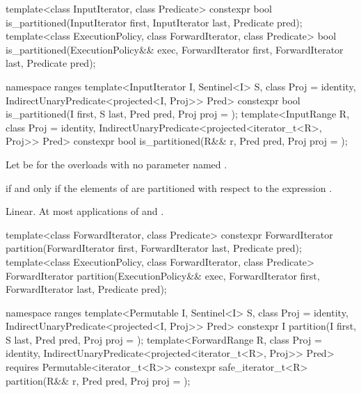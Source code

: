 %
\begin{itemdecl}
template<class InputIterator, class Predicate>
  constexpr bool is_partitioned(InputIterator first, InputIterator last, Predicate pred);
template<class ExecutionPolicy, class ForwardIterator, class Predicate>
  bool is_partitioned(ExecutionPolicy&& exec,
                      ForwardIterator first, ForwardIterator last, Predicate pred);

namespace ranges {
  template<InputIterator I, Sentinel<I> S, class Proj = identity,
           IndirectUnaryPredicate<projected<I, Proj>> Pred>
    constexpr bool is_partitioned(I first, S last, Pred pred, Proj proj = {});
  template<InputRange R, class Proj = identity,
           IndirectUnaryPredicate<projected<iterator_t<R>, Proj>> Pred>
    constexpr bool is_partitioned(R&& r, Pred pred, Proj proj = {});
}
\end{itemdecl}

\begin{itemdescr}
\pnum
Let  be 
for the overloads with no parameter named .

\pnum
\returns
{} if and only if the elements  of 
are partitioned with respect to the expression
.

\pnum
\complexity
Linear.
At most  applications of  and .
\end{itemdescr}

%
\begin{itemdecl}
template<class ForwardIterator, class Predicate>
  constexpr ForwardIterator
    partition(ForwardIterator first, ForwardIterator last, Predicate pred);
template<class ExecutionPolicy, class ForwardIterator, class Predicate>
  ForwardIterator
    partition(ExecutionPolicy&& exec,
              ForwardIterator first, ForwardIterator last, Predicate pred);

namespace ranges {
  template<Permutable I, Sentinel<I> S, class Proj = identity,
           IndirectUnaryPredicate<projected<I, Proj>> Pred>
    constexpr I
      partition(I first, S last, Pred pred, Proj proj = {});
  template<ForwardRange R, class Proj = identity,
           IndirectUnaryPredicate<projected<iterator_t<R>, Proj>> Pred>
    requires Permutable<iterator_t<R>>
    constexpr safe_iterator_t<R>
      partition(R&& r, Pred pred, Proj proj = {});
}
\end{itemdecl}

